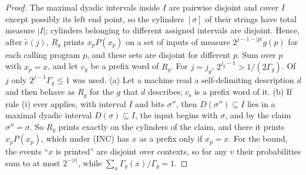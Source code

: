 \begin{proof}
The maximal dyadic intervals inside $I$ are pairwise disjoint and cover $I$ except possibly its left end
point, so the cylinders $[\sigma]$ of their strings have total measure $|I|$; cylinders belonging to
different assigned intervals are disjoint. Hence, after $\tilde e(j)$, $R_g$ prints $x_pP(x_p)$ on a set of
inputs of measure $2^{j-1-|p|}g(p)$ for each calling program $p$, and these sets are disjoint for different
$p$. Sum over $p$ with $x_p=x$, and let $v_g$ be a prefix word of $R_g$. For $j=j_g$,
$2^{j_g-1}>1/(2\Gamma_g)$. Of $j$ only $2^{j-1}\Gamma_g\le1$ was used. (a) Let a machine read a
self-delimiting description $d$ and then behave as $R_g$ for the $g$ that $d$ describes; $c_{\mathrm s}$ is
a prefix word of it. (b) If rule (i) ever applies, with interval $I$ and bits $\sigma''$, then
$D(\sigma'')\subseteq I$ lies in a maximal dyadic interval $D(\sigma)\subseteq I$, the input begins with
$\sigma$, and by the claim $\sigma''=\sigma$. So $R_g$ prints exactly on the cylinders of the claim, and
there it prints $x_pP(x_p)$, which under (INC) has $x$ as a prefix only if $x_p=x$. For the bound, the
events ``$x$ is printed'' are disjoint over contexts, so for any $v$ their probabilities sum to at most
$2^{-|v|}$, while $\sum_x\Gamma_g(x)/\Gamma_g=1$.
\end{proof}

